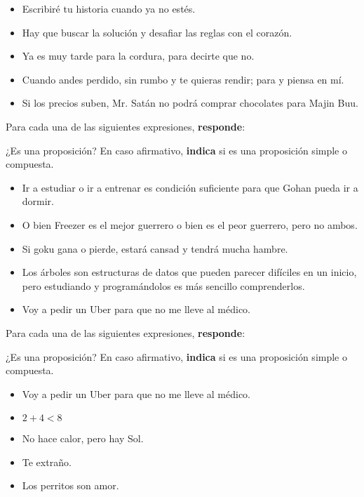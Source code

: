 \documentclass[oneside]{style}
\begin{document}
\begin{questions}[label=\protect\circled{\bfseries\arabic*}]
{        \begin{itemize}
            \item Escribiré tu historia cuando ya no estés. 
            \item Hay que buscar la solución y desafiar las reglas con el 
            corazón. 
            \item Ya es muy tarde para la cordura, para decirte que no. 
            \item Cuando andes perdido, sin rumbo y te quieras rendir; 
            para y piensa en mí. 
            \item Si los precios suben, Mr. Satán no podrá comprar 
            chocolates para Majin Buu. 
        \end{itemize}
    }

    \question
    {
        Para cada una de las siguientes expresiones, \textbf{responde}:
        \begin{center}
            ¿Es una proposición? En caso afirmativo, \textbf{indica} si 
            es una proposición simple o compuesta. 
        \end{center}

        \begin{itemize}
            \item Ir a estudiar o ir a entrenar es condición suficiente 
            para que Gohan pueda ir a dormir. 
            \item O bien Freezer es el mejor guerrero o bien es el peor 
            guerrero, pero no ambos. 
            \item Si goku gana o pierde, estará cansad y tendrá mucha hambre. 
            \item Los árboles son estructuras de datos que pueden parecer 
            difíciles en un inicio, pero estudiando y programándolos es 
            más sencillo comprenderlos. 
            \item Voy a pedir un Uber para que no me lleve al médico.
        \end{itemize}
    }

    \newpage
    \question
    {
        Para cada una de las siguientes expresiones, \textbf{responde}:
        \begin{center}
            ¿Es una proposición? En caso afirmativo, \textbf{indica} si 
            es una proposición simple o compuesta. 
        \end{center}

        \begin{itemize}
            \item Voy a pedir un Uber para que no me lleve al médico. 
            \item $2 + 4 < 8$
            \item No hace calor, pero hay Sol. 
            \item Te extraño. 
            \item Los perritos son amor. 
        \end{itemize}
    }


\end{questions}
\end{document}
